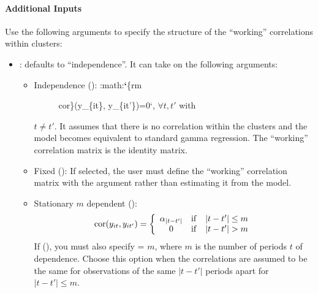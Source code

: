 \documentclass[letterpaper,10pt,english]{sphinxmanual}
\begin{document}
\paragraph{Additional Inputs}
\label{zelig-gammagee:additional-inputs}
Use the following arguments to specify the structure of the “working”
correlations within clusters:
\begin{itemize}
\item {} 
: defaults to “independence”. It can take on the following
arguments:
\begin{itemize}
\item {} \begin{description}
\item[{Independence (): :math:{\color{red}\bfseries{}{}`}\{rm}] \leavevmode
cor\}(y\_\{it\}, y\_\{it'\})=0{}`, \(\forall t, t'\) with

\end{description}

\(t\ne t'\). It assumes that there is no correlation within
the clusters and the model becomes equivalent to standard gamma
regression. The “working” correlation matrix is the identity
matrix.

\item {} 
Fixed (): If selected, the user must define the
“working” correlation matrix with the  argument rather than
estimating it from the model.

\item {} 
Stationary \(m\) dependent ():
\begin{gather}
\begin{split}{\rm cor}(y_{it}, y_{it'})=\left\{\begin{array}{ccc}
      \alpha_{|t-t'|} & {\rm if} & |t-t'|\le m \\ 0 & {\rm if}
      & |t-t'| > m
    \end{array}\right.\end{split}\notag
\end{gather}
If (), you must also specify  =
\(m\), where \(m\) is the number of periods \(t\) of
dependence. Choose this option when the correlations are assumed
to be the same for observations of the same \(|t-t'|\) periods
apart for \(|t-t'| \leq m\).



\end{itemize}
\end{itemize}
\end{document}
